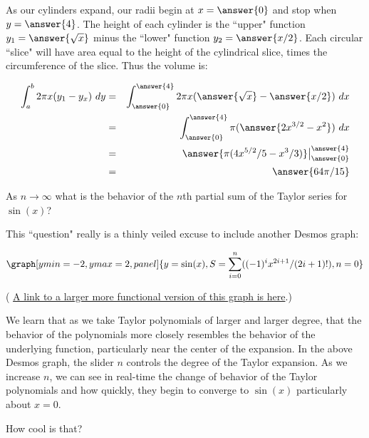 \documentclass{ximera}
\begin{document}
\begin{question}
\begin{enumerate}
\begin{explanation}
As our cylinders expand, our radii begin at $x=\answer{0}$ and stop when $y=\answer{4}$.  The height of each cylinder is the ``upper" function $y_1=\answer{\sqrt{x}}$ minus the ``lower" function $y_2=\answer{x/2}$.  Each circular ``slice" will have area equal to the height of the cylindrical slice, times the circumference of the slice.  Thus the volume is:

\begin{eqnarray*}
\int_a^b 2\pi x(y_1-y_x)\ dy&=&\int_{\answer{0}}^{\answer{4}}2\pi x(\answer{\sqrt{x}}-\answer{x/2})\ dx\\
&=&\int_{\answer{0}}^{\answer{4}}\pi (\answer{2x^{3/2}-x^2})\ dx\\
&=&\answer{\pi(4x^{5/2}/5-x^3/3)}\big|_{\answer{0}}^{\answer{4}}\\
&=&\answer{64\pi/15}
\end{eqnarray*}


\end{explanation}




\end{enumerate}

\begin{question}
As $n\to \infty$ what is the behavior of the $n$th partial sum of the Taylor series for $\sin(x)$?
\end{question}

\begin{explanation}
This ``question" really is a thinly veiled excuse to include another Desmos graph:

\begin{onlineOnly}
$$\graph[ymin=-2,ymax=2, panel]{y=\sin(x), S=\sum_{i=0}^n ((-1)^ix^{2i+1}/(2i+1)!),n=0}$$
\end{onlineOnly}
( \href{https://www.desmos.com/calculator/rv7resdzuu}{A link to a larger more functional version of this graph is here}.)


We learn that as we take Taylor polynomials of larger and larger degree, that the behavior of the polynomials more closely resembles the behavior of the underlying function, particularly near the center of the expansion.  In the above Desmos graph, the slider $n$ controls the degree of the Taylor expansion.  As we increase $n$, we can see in real-time the change of behavior of the Taylor polynomials and how quickly, they begin to converge to $\sin(x)$ particularly about $x=0$.

How cool is that?

\
\begin{multipleChoice}
\end{multipleChoice}




\end{explanation}


\end{question}
\end{document}
